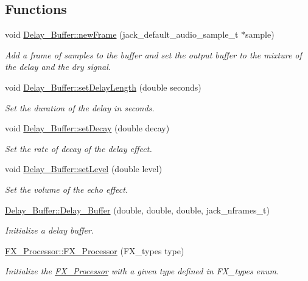 \subsection*{Functions}
\begin{DoxyCompactItemize}
\item 
void \hyperlink{group___f_x_ga5d9be4601c4309b6ff4de2dc286f4da4}{Delay\+\_\+\+Buffer\+::new\+Frame} (jack\+\_\+default\+\_\+audio\+\_\+sample\+\_\+t $\ast$sample)
\begin{DoxyCompactList}\small\item\em Add a frame of samples to the buffer and set the output buffer to the mixture of the delay and the dry signal. \end{DoxyCompactList}\item 
void \hyperlink{group___f_x_ga3e9ddb2b97fffe52c0713c26d89aae65}{Delay\+\_\+\+Buffer\+::set\+Delay\+Length} (double seconds)
\begin{DoxyCompactList}\small\item\em Set the duration of the delay in seconds. \end{DoxyCompactList}\item 
void \hyperlink{group___f_x_ga07267d6e8a0f31681e45f755b83245a7}{Delay\+\_\+\+Buffer\+::set\+Decay} (double decay)
\begin{DoxyCompactList}\small\item\em Set the rate of decay of the delay effect. \end{DoxyCompactList}\item 
void \hyperlink{group___f_x_ga52bd5fcb9ec627cf7da1ad3ecfc8bb87}{Delay\+\_\+\+Buffer\+::set\+Level} (double level)
\begin{DoxyCompactList}\small\item\em Set the volume of the echo effect. \end{DoxyCompactList}\item 
\hyperlink{group___f_x_ga54225f6e4c9f3bde732baa1d824261fc}{Delay\+\_\+\+Buffer\+::\+Delay\+\_\+\+Buffer} (double, double, double, jack\+\_\+nframes\+\_\+t)
\begin{DoxyCompactList}\small\item\em Initialize a delay buffer. \end{DoxyCompactList}\item 
\hyperlink{group___f_x_ga7ca5d9ae276fae16385774dd650a463b}{F\+X\+\_\+\+Processor\+::\+F\+X\+\_\+\+Processor} (F\+X\+\_\+types type)
\begin{DoxyCompactList}\small\item\em Initialize the \hyperlink{class_f_x___processor}{F\+X\+\_\+\+Processor} with a given type defined in F\+X\+\_\+types enum. \end{DoxyCompactList}\item 

\end{DoxyCompactItemize}

